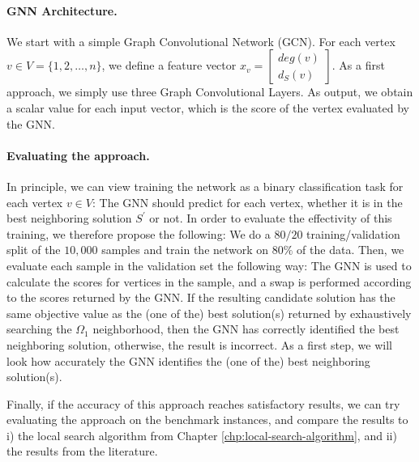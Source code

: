 \documentclass[draft,final]{vutinfth} %
\begin{document}
\paragraph{GNN Architecture.} We start with a simple Graph Convolutional Network (GCN). For each vertex $v \in V = \{1,2,\dots,n\}$, we define a feature vector 
$x_v = 
\begin{bmatrix} deg(v) \\
    d_S(v) 
\end{bmatrix}$. 
As a first approach, we simply use three Graph Convolutional Layers. As output, we obtain a scalar value for each input vector, which is the score of the vertex evaluated by the GNN. 

\paragraph{Evaluating the approach.} 
In principle, we can view training the network as a binary classification task for each vertex $v \in V$: The GNN should predict for each vertex, whether it is in the best neighboring solution $S^\prime$ or not. 
In order to evaluate the effectivity of this training, we therefore propose the following: We do a $80/20$ training/validation split of the $10,000$ samples and train the network on $80\%$ of the data. Then, we evaluate each sample in the validation set the following way: The GNN is used to calculate the scores for vertices in the sample, and a swap is performed according to the scores returned by the GNN. If the resulting candidate solution has the same objective value as the (one of the) best solution(s) returned by exhaustively searching the $\Omega_1$ neighborhood, then the GNN has correctly identified the best neighboring solution, otherwise, the result is incorrect. As a first step, we will look how accurately the GNN identifies the (one of the) best neighboring solution(s). 

Finally, if the accuracy of this approach reaches satisfactory results, we can try evaluating the approach on the benchmark instances, and compare the results to i) the local search algorithm from Chapter \ref{chp:local-search-algorithm}, and ii) the results from the literature. 
\end{document}
